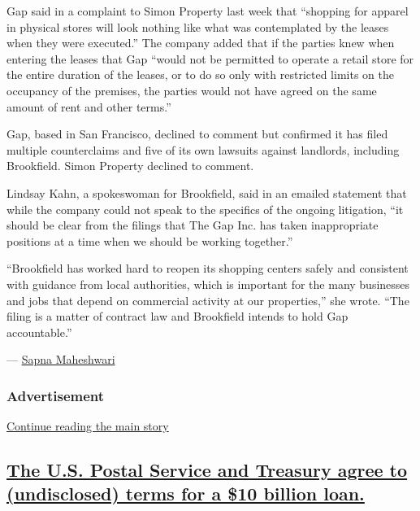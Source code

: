 Gap said in a complaint to Simon Property last week that ``shopping for
apparel in physical stores will look nothing like what was contemplated
by the leases when they were executed.'' The company added that if the
parties knew when entering the leases that Gap ``would not be permitted
to operate a retail store for the entire duration of the leases, or to
do so only with restricted limits on the occupancy of the premises, the
parties would not have agreed on the same amount of rent and other
terms.''

Gap, based in San Francisco, declined to comment but confirmed it has
filed multiple counterclaims and five of its own lawsuits against
landlords, including Brookfield. Simon Property declined to comment.

Lindsay Kahn, a spokeswoman for Brookfield, said in an emailed statement
that while the company could not speak to the specifics of the ongoing
litigation, ``it should be clear from the filings that The Gap Inc. has
taken inappropriate positions at a time when we should be working
together.''

``Brookfield has worked hard to reopen its shopping centers safely and
consistent with guidance from local authorities, which is important for
the many businesses and jobs that depend on commercial activity at our
properties,'' she wrote. ``The filing is a matter of contract law and
Brookfield intends to hold Gap accountable.''

--- \href{https://www.nytimes.com/by/sapna-maheshwari}{Sapna Maheshwari}

\hypertarget{advertisement-2}{%
\subsubsection{Advertisement}\label{advertisement-2}}

\protect\hyperlink{after-dfp-ad-mid3}{Continue reading the main story}

\hypertarget{the-us-postal-service-and-treasury-agree-to-undisclosed-terms-for-a-10-billion-loan}{%
\subsection{\texorpdfstring{\protect\hyperlink{the-us-postal-service-and-treasury-agree-to-undisclosed-terms-for-a-10-billion-loan}{The
U.S. Postal Service and Treasury agree to (undisclosed) terms for a \$10
billion
loan.}}{The U.S. Postal Service and Treasury agree to (undisclosed) terms for a \$10 billion loan.}}\label{the-us-postal-service-and-treasury-agree-to-undisclosed-terms-for-a-10-billion-loan}}

